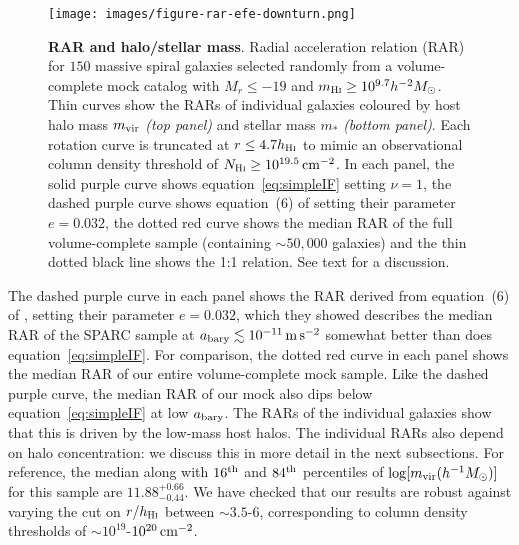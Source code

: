 \documentclass[usenatbib]{mnras}
\newcommand{\Hi}{\textsc{Hi}}
\newcommand{\abary}{\ensuremath{a_{\rm bary}}}
\newcommand{\Mh}{\ensuremath{h^{-1}M_{\odot}}}
\newcommand{\Mhsq}{\ensuremath{h^{-2}M_{\odot}}}
\newcommand{\msq}{\ensuremath{{\rm \,m\,s}^{-2}}}
\newcommand{\eqn}[1]{equation~\eqref{#1}}
\begin{document}
\begin{figure}
\centering
\texttt{[image: images/figure-rar-efe-downturn.png]}
\caption{{\bf RAR and halo/stellar mass}. Radial acceleration relation (RAR) for $150$ massive spiral galaxies selected randomly from a volume-complete mock catalog with $M_r\leq-19$ and $m_{\Hi}\geq10^{9.7}\Mhsq$. Thin curves show the RARs of individual galaxies coloured by host halo mass $m_{\rm vir}$ \emph{(top panel)} and stellar mass $m_\ast$ \emph{(bottom panel)}.  
Each rotation curve is truncated at $r\leq4.7h_{\Hi}$ to mimic an observational column density threshold of $N_{\Hi}\geq10^{19.5}\,{\rm cm}^{-2}$. 
In each panel, the solid purple curve shows \eqn{eq:simpleIF} setting $\nu=1$, the dashed purple curve shows equation~(6) of  setting their parameter $e=0.032$, the dotted red curve shows the median RAR of the full volume-complete sample (containing $\sim50,000$ galaxies) and the thin dotted black line shows the 1:1 relation. 
See text for a discussion. 
}
\label{fig:efe-downturn}
\end{figure}


The dashed purple curve in each panel shows the RAR derived from equation~(6) of , setting their parameter $e=0.032$,  which they showed describes the median  RAR of the SPARC sample at $\abary\lesssim10^{-11}\msq$ somewhat better than does \eqn{eq:simpleIF}. For comparison, the dotted red curve in each panel shows the  median RAR of our entire volume-complete mock sample. Like the dashed purple curve, the median RAR of our mock also dips below \eqn{eq:simpleIF} at low \abary. The RARs of the individual galaxies show that this is driven by the low-mass host halos. The individual RARs also depend on halo concentration: we discuss this in more detail in the next subsections.  For reference, the median along with $16^{\rm th}$ and $84^{\rm th}$ percentiles of $\log[m_{\rm vir}(\Mh)]$ for this sample are $11.88_{-0.44}^{+0.66}$. We have checked that our results are robust against varying the cut on $r/h_{\Hi}$ between $\sim3.5$-$6$, corresponding to column density thresholds of $\sim10^{19}$-$10^{20}\,{\rm cm}^{-2}$.
\end{document}
